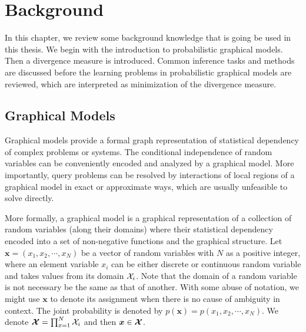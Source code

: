 \chapter{Background}
\label{chapter2}
In this chapter, we review some background knowledge that is going be used in this thesis. We begin with the introduction to probabilistic graphical models. Then a divergence measure is introduced. Common inference tasks and methods are discussed before the learning problems in probabilistic graphical models are reviewed, which are interpreted as minimization of the divergence measure.

\section{Graphical Models}
\label{chpt2:sec:graphical-models}
Graphical models provide a formal graph representation of statistical dependency of complex problems or systems. The conditional independence of random variables can be conveniently encoded and analyzed by a graphical model. More importantly, query problems can be resolved by interactions of local regions of a graphical model in exact or approximate ways, which are usually unfeasible to solve directly.

More formally, a graphical model is a graphical representation of a collection of random variables (along their domains) where their statistical dependency encoded into a set of non-negative functions and the graphical structure. Let $\bm{x}= (x_1, x_2, \cdots, x_N)$ be a vector of random variables with $N$ as a positive integer, where an element variable $x_i$ can be either discrete or continuous random variable and takes values from its domain $\mathcal{X}_i$. Note that the domain of a random variable is not necessary be the same as that of another. With some abuse of notation, we might use $\bm{x}$ to denote its assignment when there is no cause of ambiguity in context. The joint probability is denoted by $p(\bm{x})=p(x_1, x_2, \cdots, x_N)$.
We denote $\bm{\mathcal{X}} = \prod_{x=1}^{N} \mathcal{X}_i$ and then $\bm{x}\in \bm{\mathcal{X}}$.

